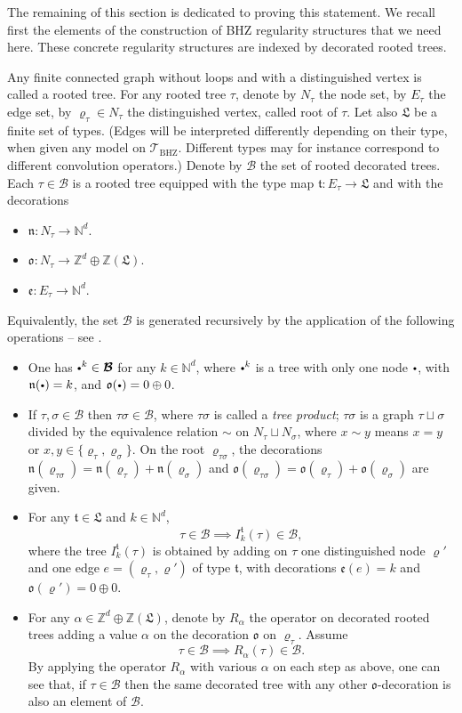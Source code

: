 \documentclass[11pt]{article}
\numberwithin{equation}{section}
\newcommand{\sbullet}{{\scriptscriptstyle\bullet}}
\newcommand{\scbullet}{{\raisebox{1pt}{$\sbullet$}}}
\theoremstyle{plain}
\theoremstyle{definition}
\newcommand{\BHZ}{{\scriptscriptstyle\mathrm{BHZ}}}
\newcommand{\bsmcB}{\boldsymbol{\mathcal{B}}}
\newcommand{\scrT}{\mathscr{T}}
\newcommand{\frkL}{\mathfrak{L}}
\newcommand{\frkt}{\mathfrak{t}}
\newcommand{\frkn}{\mathfrak{n}}
\newcommand{\frko}{\mathfrak{o}}
\newcommand{\frke}{\mathfrak{e}}
\newcommand{\bbN}{\mathbb{N}}
\newcommand{\bbZ}{\mathbb{Z}}
\begin{document}
The remaining of this section is dedicated to proving this statement. We recall first the elements of the construction of BHZ regularity structures that we need here. These concrete regularity structures are indexed by decorated rooted trees.

Any finite connected graph without loops and with a distinguished vertex is called a rooted tree. For any rooted tree $\tau$, denote by $N_\tau$ the node set, by $E_\tau$ the edge set, by $\varrho_\tau\in N_\tau$ the distinguished vertex, called root of $\tau$. Let also $\frkL$ be a finite set of types. (Edges will be interpreted differently depending on their type, when given any model on $\scrT_{\BHZ}$. Different types may for instance correspond to different convolution operators.) Denote by $\bsmcB$ the set of rooted decorated trees. Each $\tau\in\bsmcB$ is a rooted tree equipped with the type map $\frkt:E_\tau\to\frkL$ and with the decorations
\begin{itemize}
\item $\frkn:N_\tau\to\bbN^d$.
\item $\frko:N_\tau\to\bbZ^d\oplus\bbZ(\frkL)$.
\item $\frke:E_\tau\to\bbN^d$.
\end{itemize}
Equivalently, the set $\bsmcB$ is generated recursively by the application of the following operations -- see \cite[\S 4.3]{BHZ}.
\begin{itemize}
\item One has $\scbullet^k\in\bsmcB$ for any $k\in\bbN^d$, where $\scbullet^k$ is a tree with only one node $\scbullet$, with $\frkn(\scbullet)=k$, and $\frko(\scbullet)=0\oplus0$.
\item If $\tau,\sigma\in\bsmcB$ then $\tau\sigma\in\bsmcB$, where $\tau\sigma$ is called a \emph{tree product}; $\tau\sigma$ is a graph $\tau\sqcup\sigma$ divided by the equivalence relation $\sim$ on $N_\tau\sqcup N_\sigma$, where $x\sim y$ means $x=y$ or $x,y\in\{\varrho_\tau,\varrho_\sigma\}$. On the root $\varrho_{\tau\sigma}$, the decorations $\frkn(\varrho_{\tau\sigma})=\frkn(\varrho_\tau)+\frkn(\varrho_\sigma)$ and $\frko(\varrho_{\tau\sigma})=\frko(\varrho_\tau)+\frko(\varrho_\sigma)$ are given.
\item For any $\frkt\in\frkL$ and $k\in\bbN^d$,
\[
\tau\in\bsmcB\implies I_k^\frkt(\tau)\in\bsmcB,
\]
where the tree $I_k^\frkt(\tau)$ is obtained by adding on $\tau$ one distinguished node $\varrho'$ and one edge $e=(\varrho_\tau,\varrho')$ of type $\frkt$, with decorations $\frke(e)=k$ and $\frko(\varrho')=0\oplus0$.
\item For any $\alpha\in\bbZ^d\oplus\bbZ(\frkL)$, denote by $R_\alpha$ the operator on decorated rooted trees adding a value $\alpha$ on the decoration $\frko$ on $\varrho_\tau$. Assume
\[
\tau\in\bsmcB \implies R_\alpha(\tau)\in\bsmcB.
\]
By applying the operator $R_\alpha$ with various $\alpha$ on each step as above, one can see that, if $\tau\in\bsmcB$ then the same decorated tree with any other $\frko$-decoration is also an element of $\bsmcB$.
\end{itemize}
\end{document}
